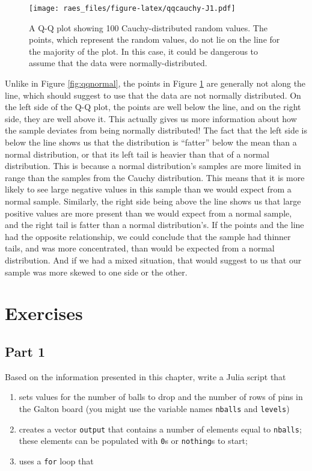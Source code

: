 \documentclass[
  11pt,
]{book}
\providecommand{\tightlist}{%
  \setlength{\itemsep}{0pt}\setlength{\parskip}{0pt}}
\begin{document}
\begin{figure}
\centering
\texttt{[image: raes\_files/figure-latex/qqcauchy-J1.pdf]}
\caption{\label{fig:qqcauchy}A Q-Q plot showing 100 Cauchy-distributed random values. The points, which represent the random values, do not lie on the line for the majority of the plot. In this case, it could be dangerous to assume that the data were normally-distributed.}
\end{figure}

Unlike in Figure \ref{fig:qqnormal}, the points in Figure \ref{fig:qqcauchy} are generally not along the line, which should suggest to use that the data are not normally distributed. On the left side of the Q-Q plot, the points are well below the line, and on the right side, they are well above it. This actually gives us more information about how the sample deviates from being normally distributed! The fact that the left side is below the line shows us that the distribution is \enquote{fatter} below the mean than a normal distribution, or that its left tail is heavier than that of a normal distribution. This is because a normal distribution's samples are more limited in range than the samples from the Cauchy distribution. This means that it is more likely to see large negative values in this sample than we would expect from a normal sample. Similarly, the right side being above the line shows us that large positive values are more present than we would expect from a normal sample, and the right tail is fatter than a normal distribution's. If the points and the line had the opposite relationship, we could conclude that the sample had thinner tails, and was more concentrated, than would be expected from a normal distribution. And if we had a mixed situation, that would suggest to us that our sample was more skewed to one side or the other.

\hypertarget{exercises-1}{%
\section{Exercises}\label{exercises-1}}

\hypertarget{part-1-1}{%
\subsection*{Part 1}\label{part-1-1}}


Based on the information presented in this chapter, write a Julia script that

\begin{enumerate}
\def\labelenumi{\arabic{enumi}.}
\tightlist
\item
  sets values for the number of balls to drop and the number of rows of pins in the Galton board (you might use the variable names \texttt{nballs} and \texttt{levels})
\item
  creates a vector \texttt{output} that contains a number of elements equal to \texttt{nballs}; these elements can be populated with \texttt{0}s or \texttt{nothing}s to start;
\item
  uses a \texttt{for} loop that
\end{enumerate}
\end{document}
